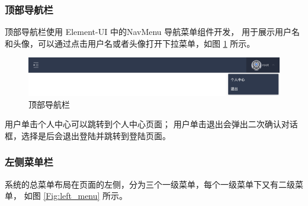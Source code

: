 \subsubsection{顶部导航栏}
顶部导航栏使用 Element-UI 中的NavMenu 导航菜单组件开发，
用于展示用户名和头像，可以通过点击用户名或者头像打开下拉菜单，如图 \ref{Fig:top} 所示。

\begin{figure}[ht]
    \centering
    \includegraphics[width=1\linewidth]{./Figure/IMG_top.png}
    \caption{顶部导航栏}\label{Fig:top}
\end{figure}

用户单击个人中心可以跳转到个人中心页面；
用户单击退出会弹出二次确认对话框，选择是后会退出登陆并跳转到登陆页面。

\subsubsection{左侧菜单栏}
系统的总菜单布局在页面的左侧，分为三个一级菜单，每个一级菜单下又有二级菜单，
如图 \ref{Fig:left_menu} 所示。

